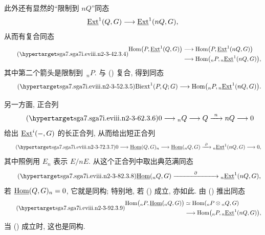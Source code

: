 此外还有显然的“限制到 $nQ$”同态
\[
 \uExt^1(Q,G)\longrightarrow\uExt^1(nQ,G),
\]
从而有复合同态
\begin{equation}\tag{\SGARefTarget{sga7.sga7i.eviii.n2-3-4}{2.3.4}}
\begin{split}
 \operatorname{Hom}\bigl(P,\uExt^1(Q,G)\bigr)
 &\longrightarrow
 \operatorname{Hom}\bigl(P,\uExt^1(nQ,G)\bigr)\\
 &\longrightarrow
 \operatorname{Hom}\bigl({}_nP,{}_n\uExt^1(nQ,G)\bigr),
\end{split}
\end{equation}
其中第二个箭头是限制到 $\,{}_nP$. 与 () 复合, 得到同态
\begin{equation}\tag{\SGARefTarget{sga7.sga7i.eviii.n2-3-5}{2.3.5}}
 \mathrm{Biext}^1(P,Q;G)
 \longrightarrow
 \operatorname{Hom}\bigl({}_nP,{}_n\uExt^1(nQ,G)\bigr).
\end{equation}

另一方面, 正合列
\begin{equation}\tag{\SGARefTarget{sga7.sga7i.eviii.n2-3-6}{2.3.6}}
 0\longrightarrow{}_nQ\longrightarrow Q
 \xrightarrow{\ n\ }nQ\longrightarrow0
\end{equation}
给出 $\uExt^i(-,G)$ 的长正合列, 从而给出短正合列
\begin{equation}\tag{\SGARefTarget{sga7.sga7i.eviii.n2-3-7}{2.3.7}}
 0\longrightarrow\uHom(Q,G)_n
 \longrightarrow\uHom({}_nQ,G)
 \xrightarrow{\ \partial\ }
 {}_n\uExt^1(nQ,G)
 \longrightarrow0,
\end{equation}
其中照例用 $E_n$ 表示 $E/nE$. 从这个正合列中取出典范满同态
\begin{equation}\tag{\SGARefTarget{sga7.sga7i.eviii.n2-3-8}{2.3.8}}
 \uHom({}_nQ,G)
 \xrightarrow{\hspace{3em}\partial\hspace{3em}}
 {}_n\uExt^1(nQ,G),
\end{equation}
若 $\uHom(Q,G)_n=0$, 它就是同构; 特别地, 若 () 成立, 亦如此. 由 () 推出同态
\begin{equation}\tag{\SGARefTarget{sga7.sga7i.eviii.n2-3-9}{2.3.9}}
\begin{split}
 \operatorname{Hom}\bigl({}_nP,\uHom({}_nQ,G)\bigr)
 &\simeq
 \operatorname{Hom}({}_nP\otimes{}_nQ,G)\\
 &\longrightarrow
 \operatorname{Hom}\bigl({}_nP,{}_n\uExt^1(nQ,G)\bigr),
\end{split}
\end{equation}
当 () 成立时, 这也是同构.

